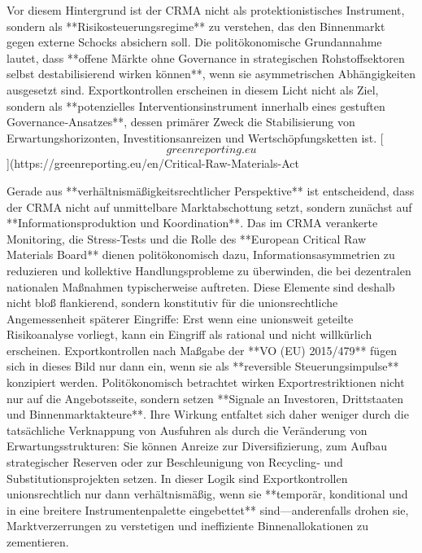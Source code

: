 \documentclass[12pt,a4paper,oneside]{book} %
\begin{document}
Vor diesem Hintergrund ist der CRMA nicht als protektionistisches Instrument, sondern als **Risikosteuerungsregime** zu verstehen, das den Binnenmarkt gegen externe Schocks absichern soll. Die politökonomische Grundannahme lautet, dass **offene Märkte ohne Governance in strategischen Rohstoffsektoren selbst destabilisierend wirken können**, wenn sie asymmetrischen Abhängigkeiten ausgesetzt sind.  Exportkontrollen erscheinen in diesem Licht nicht als Ziel, sondern als **potenzielles Interventionsinstrument innerhalb eines gestuften Governance‑Ansatzes**, dessen primärer Zweck die Stabilisierung von Erwartungshorizonten, Investitionsanreizen und Wertschöpfungsketten ist. [\[greenreporting.eu\]](https://greenreporting.eu/en/Critical-Raw-Materials-Act%

Gerade aus **verhältnismäßigkeitsrechtlicher Perspektive** ist entscheidend, dass der CRMA nicht auf unmittelbare Marktabschottung setzt, sondern zunächst auf **Informationsproduktion und Koordination**. Das im CRMA verankerte Monitoring, die Stress‑Tests und die Rolle des **European Critical Raw Materials Board** dienen politökonomisch dazu, Informationsasymmetrien zu reduzieren und kollektive Handlungsprobleme zu überwinden, die bei dezentralen nationalen Maßnahmen typischerweise auftreten.  Diese Elemente sind deshalb nicht bloß flankierend, sondern konstitutiv für die unionsrechtliche Angemessenheit späterer Eingriffe: Erst wenn eine unionsweit geteilte Risikoanalyse vorliegt, kann ein Eingriff als rational und nicht willkürlich erscheinen. 
Exportkontrollen nach Maßgabe der **VO (EU) 2015/479** fügen sich in dieses Bild nur dann ein, wenn sie als **reversible Steuerungsimpulse** konzipiert werden. Politökonomisch betrachtet wirken Exportrestriktionen nicht nur auf die Angebotsseite, sondern setzen **Signale an Investoren, Drittstaaten und Binnenmarktakteure**.  Ihre Wirkung entfaltet sich daher weniger durch die tatsächliche Verknappung von Ausfuhren als durch die Veränderung von Erwartungsstrukturen: Sie können Anreize zur Diversifizierung, zum Aufbau strategischer Reserven oder zur Beschleunigung von Recycling‑ und Substitutionsprojekten setzen.  In dieser Logik sind Exportkontrollen unionsrechtlich nur dann verhältnismäßig, wenn sie **temporär, konditional und in eine breitere Instrumentenpalette eingebettet** sind—anderenfalls drohen sie, Marktverzerrungen zu verstetigen und ineffiziente Binnenallokationen zu zementieren. 
\end{document}
